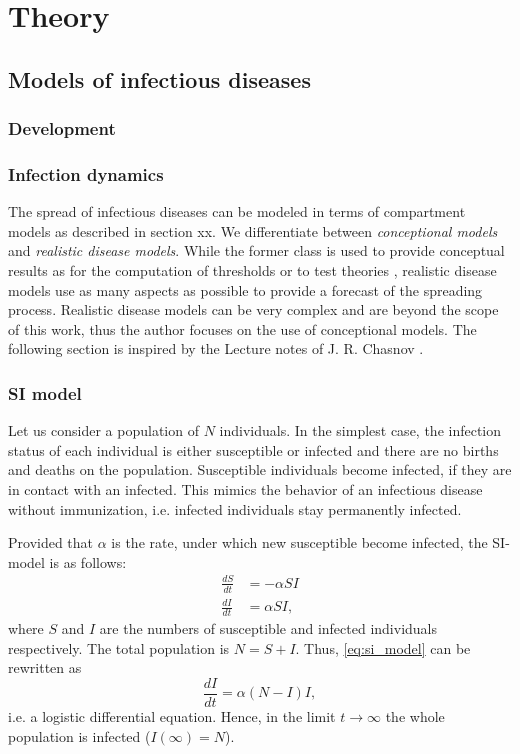 %

\chapter{Theory}

\section{Models of infectious diseases}

\subsection{Development}



\subsection{Infection dynamics}

The spread of infectious diseases can be modeled in terms of compartment models as described in section xx.
We differentiate between \emph{conceptional models} and \emph{realistic disease models}.
While the former class is used to provide conceptual results as for the computation of thresholds or to test theories \cite{Hethcote:2000}, realistic disease models use as many aspects as possible to provide a forecast of the spreading process.
Realistic disease models can be very complex and are beyond the scope of this work, thus the author focuses on the use of conceptional models.
The following section is inspired by the Lecture notes of J. R. Chasnov \cite{Chasnov:2010}.

\subsection{SI model}\label{sec:si_model}
Let us consider a population of $N$ individuals.
In the simplest case, the infection status of each individual is either susceptible or infected and there are no births and deaths on the population.
Susceptible individuals become infected, if they are in contact with an infected.
This mimics the behavior of an infectious disease without immunization, i.e. infected individuals stay permanently infected.

Provided that $\alpha $ is the rate, under which new susceptible become infected, the SI-model is as follows:
\begin{align}\label{eq:si_model}
\frac{dS}{dt} &= -\alpha SI \nonumber \\
\frac{dI}{dt} &= \alpha SI,
\end{align}
where $S$ and $I$ are the numbers of susceptible and infected individuals respectively.
The total population is $N=S+I$.
Thus, \eqref{eq:si_model} can be rewritten as
$$
\frac{dI}{dt}=\alpha (N-I)I,
$$
i.e. a logistic differential equation.
Hence, in the limit $t\rightarrow \infty $ the whole population is infected ($I(\infty )=N$). 

